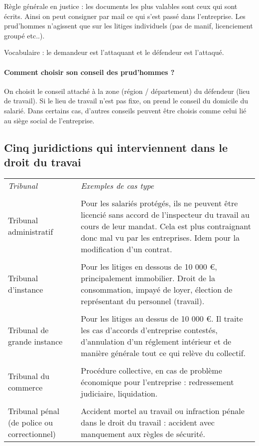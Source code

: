 	Règle générale en justice : les documents les plus valables sont ceux qui sont écrits. Ainsi on peut consigner par mail ce qui s’est passé dans l’entreprise.
	Les prud'hommes n'agissent que sur les litiges individuels (pas de manif, licenciement groupé etc..).
	
	Vocabulaire : le demandeur est l'attaquant et le défendeur est l'attaqué.
	
	\paragraph{Comment choisir son conseil des prud'hommes ?}
	On choisit le conseil attaché à la zone (région / département) du défendeur (lieu de travail).
	Si le lieu de travail n’est pas fixe, on prend le conseil du domicile du salarié.
	Dans certains cas, d’autres conseils peuvent être choisis comme celui lié au siège social de l'entreprise.


\subsection{Cinq juridictions qui interviennent dans le droit du travai}

	\begin{tabular}{m{4cm}|m{11cm}}
	\textit{Tribunal} & \textit{Exemples de cas type} \\ \\

	Tribunal administratif & Pour les salariés protégés, ils ne peuvent être licencié sans accord de l’inspecteur du travail au cours de leur mandat. Cela est plus contraignant donc mal vu par les entreprises. Idem pour la modification d'un contrat. \\ \\

	Tribunal d’instance & Pour les litiges en dessous de 10 000 \euro, principalement immobilier. Droit de la consommation, impayé de loyer, élection de représentant du personnel (travail). \\ \\

	Tribunal de grande instance & Pour les litiges au dessus de 10 000 \euro. Il traite les cas d'accords d'entreprise contestés, d'annulation d'un réglement intérieur et de manière générale tout ce qui relève du collectif. \\ \\

	Tribunal du commerce & Procédure collective, en cas de problème économique pour l'entreprise : redressement judiciaire, liquidation. \\ \\

	Tribunal pénal (de police ou correctionnel) & Accident mortel au travail ou infraction pénale dans le droit du travail : accident avec manquement aux règles de sécurité.
	\end{tabular}\\
	
